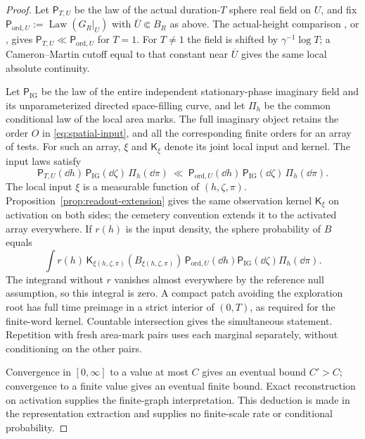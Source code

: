 \begin{proof}
Let \(\mathsf P_{T,U}\) be the law of the actual duration-\(T\) sphere
real field on \(U\), and fix
\(\mathsf P_{\mathrm{ord},U}:=\operatorname{Law}(G_R|_U)\) with
\(\overline U\Subset B_R\) as above.  The actual-height comparison
\cite[Lemma~5.13 and Proposition~5.12]{C}, or
\cite[Lemma~3.3, as used in Lemma~18.1]{P}, gives
\(\mathsf P_{T,U}\ll\mathsf P_{\mathrm{ord},U}\) for \(T=1\).
For \(T\ne1\) the field is shifted by \(\gamma^{-1}\log T\); a
Cameron--Martin cutoff equal to that constant near \(\overline U\)
gives the same local absolute continuity.

Let \(\mathsf P_{\mathrm{IG}}\) be the law of the entire independent
stationary-phase imaginary field and its unparameterized directed
space-filling curve, and let \(\Pi_h\) be the common conditional law
of the local area marks.  The full imaginary object retains the order
\(O\) in \eqref{eq:spatial-input}, and all the corresponding finite
orders for an array of tests.  For such an array, \(\xi\) and
\(\mathsf K_\xi\) denote its joint local input and kernel.  The input laws satisfy
\begin{equation}
 \mathsf P_{T,U}(\dd h)\,
 \mathsf P_{\mathrm{IG}}(\dd\zeta)\,\Pi_h(\dd\pi)
 \ \ll\
 \mathsf P_{\mathrm{ord},U}(\dd h)\,
 \mathsf P_{\mathrm{IG}}(\dd\zeta)\,\Pi_h(\dd\pi).
 \label{eq:sphere-input-domination}
\end{equation}
The local input \(\xi\) is a measurable function of \((h,\zeta,\pi)\).
Proposition~\ref{prop:readout-extension} gives the same observation
kernel \(\mathsf K_\xi\) on activation on both sides; the cemetery
convention extends it to the activated array everywhere.  If \(r(h)\)
is the input density,
the sphere probability of \(B\) equals
\begin{equation}
 \int r(h)\,\mathsf K_{\xi(h,\zeta,\pi)}(B_{\xi(h,\zeta,\pi)})
       \,\mathsf P_{\mathrm{ord},U}(\dd h)
         \mathsf P_{\mathrm{IG}}(\dd\zeta)\Pi_h(\dd\pi).
 \label{eq:sphere-support-integral}
\end{equation}
The integrand without \(r\) vanishes almost everywhere by the reference
null assumption, so this integral is zero.  A compact patch avoiding
the exploration root has full time preimage in a strict interior of
\((0,T)\), as required for the finite-word kernel.  Countable
intersection gives the simultaneous statement.  Repetition with
fresh area-mark pairs uses each marginal separately, without conditioning
on the other pairs.

Convergence in \([0,\infty]\) to a value at most \(C\) gives an
eventual bound \(C'>C\); convergence to a finite value gives an
eventual finite bound.  Exact reconstruction on activation supplies
the finite-graph interpretation.  This deduction is made in the
representation extraction and supplies no finite-scale rate or
conditional probability.
\end{proof}

